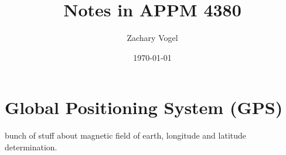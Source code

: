 \documentclass{article}
\author{Zachary Vogel}
\title{Notes in APPM 4380}
\date{\today}
\begin{document}
\maketitle
\section{Global Positioning System (GPS)}
bunch of stuff about magnetic field of earth, longitude and latitude determination.\\
\end{document}
